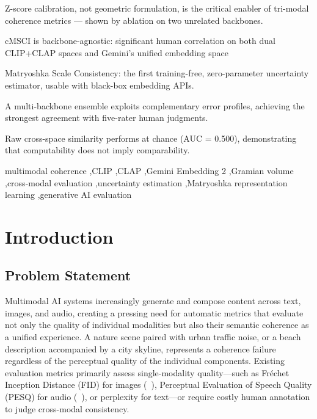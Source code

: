 \documentclass[a4paper,fleqn]{cas-sc}
\begin{document}
\begin{highlights}
\item Z-score calibration, not geometric formulation, is the critical enabler of tri-modal coherence metrics — shown by ablation on two unrelated backbones.
\item cMSCI is backbone-agnostic: significant human correlation on both dual CLIP+CLAP spaces and Gemini’s unified embedding space
\item Matryoshka Scale Consistency: the first training-free, zero-parameter uncertainty estimator, usable with black-box embedding APIs.
\item A multi-backbone ensemble exploits complementary error profiles, achieving the strongest agreement with five-rater human judgments.
\item Raw cross-space similarity performs at chance (AUC = 0.500), demonstrating that computability does not imply comparability.
\end{highlights}


\begin{keywords}
multimodal coherence \sep CLIP \sep CLAP \sep Gemini Embedding 2 \sep Gramian volume \sep cross-modal evaluation \sep uncertainty estimation \sep Matryoshka representation learning \sep generative AI evaluation
\end{keywords}




\maketitle

\section{Introduction}\label{sec:introduction}

\subsection{Problem Statement}
Multimodal AI systems increasingly generate and compose content across text, images, and audio, creating a pressing need for automatic metrics that evaluate not only the quality of individual modalities but also their semantic coherence as a unified experience. A nature scene paired with urban traffic noise, or a beach description accompanied by a city skyline, represents a coherence failure regardless of the perceptual quality of the individual components. Existing evaluation metrics primarily assess single-modality quality---such as Fr\'echet Inception Distance (FID) for images (~\cite{heusel2017fid}), Perceptual Evaluation of Speech Quality (PESQ) for audio (~\cite{rix2001pesq}), or perplexity for text---or require costly human annotation to judge cross-modal consistency.
\end{document}
